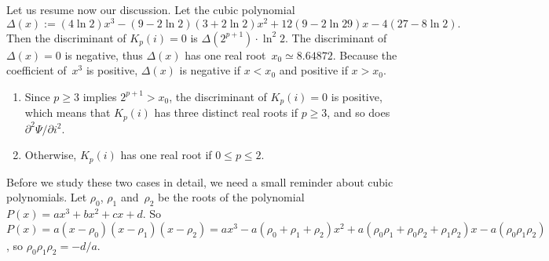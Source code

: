 Let us resume now our discussion. Let the cubic polynomial
\begin{equation*}
\Delta(x) \!:= (4\ln 2)x^3 - (9 - 2\ln 2)(3 + 2\ln 2)x^2 + 12(9 - 2\ln
29)x - 4(27 - 8\ln 2).
\end{equation*}
Then the discriminant of \(K_p(i) = 0\) is \(\Delta(2^{p+1}) \cdot
\ln^2 2\). The discriminant of \(\Delta(x) = 0 \) is negative, thus
\(\Delta(x)\) has one real root~\(x_0 \simeq 8.64872\). Because the
coefficient of~\(x^3\) is positive, \(\Delta(x)\) is negative if \(x <
x_0\) and positive if \(x > x_0\).
\begin{enumerate}

  \item Since \(p \geqslant 3\) implies \(2^{p+1} > x_0\), the
    discriminant of \(K_p(i) = 0\) is positive,
    which means that \(K_p(i)\) has three distinct real roots if \(p
    \geqslant 3\), and so does \(\partial^2\Psi/\partial
    i^2\).

  \item Otherwise, \(K_p(i)\) has one real root if \(0 \leqslant p
    \leqslant 2\).

\end{enumerate}
Before we study these two cases in detail, we need a small reminder
about cubic polynomials. Let \(\rho_0\), \(\rho_1\) and~\(\rho_2\) be
the roots of the polynomial \(P(x) = ax^3 + bx^2 + cx + d\). So \(P(x)
= a(x-\rho_0)(x-\rho_1)(x-\rho_2) = ax^3 - a(\rho_0+\rho_1+\rho_2)x^2
+ a(\rho_0\rho_1 + \rho_0\rho_2 + \rho_1 \rho_2)x -
a(\rho_0\rho_1\rho_2)\), so \(\rho_0\rho_1\rho_2 = -d/a\).
